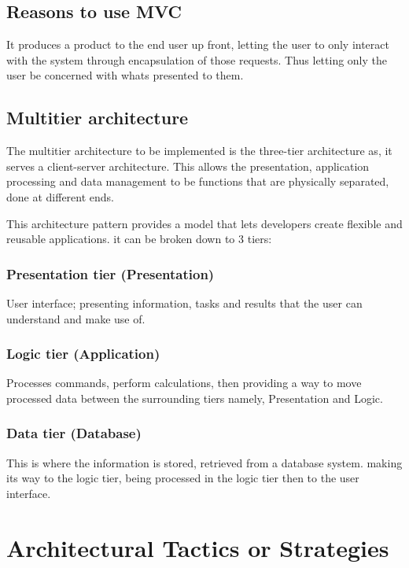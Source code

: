 \documentclass[hidelinks,a4paper,12pt]{article}
\begin{document}
\subsection{Reasons to use MVC}
It produces a product to the end user up front, letting the user to only interact with the system through
encapsulation of those requests. Thus letting only the user be concerned with whats presented to them. 

\subsection{Multitier architecture}
The multitier architecture to be implemented is the three-tier architecture as, it serves a client-server architecture.
This allows the presentation, application processing and data management to be functions that are physically separated, 
done at different ends.

This architecture pattern provides a model that lets developers create flexible and reusable applications. 
it can be broken down to 3 tiers: 

\subsubsection{Presentation tier (Presentation)}
User interface; presenting information, tasks and results that the
user can understand and make use of.
\subsubsection{Logic tier (Application)}
Processes commands, perform calculations, then providing a way to move processed data 
between the surrounding tiers namely, Presentation and Logic.
\subsubsection{ Data tier (Database)}
This is where the information is stored, retrieved from a database system. making its way 
to the logic tier, being processed in the logic tier then to the user interface.




\section{Architectural Tactics or Strategies}
\end{document}
